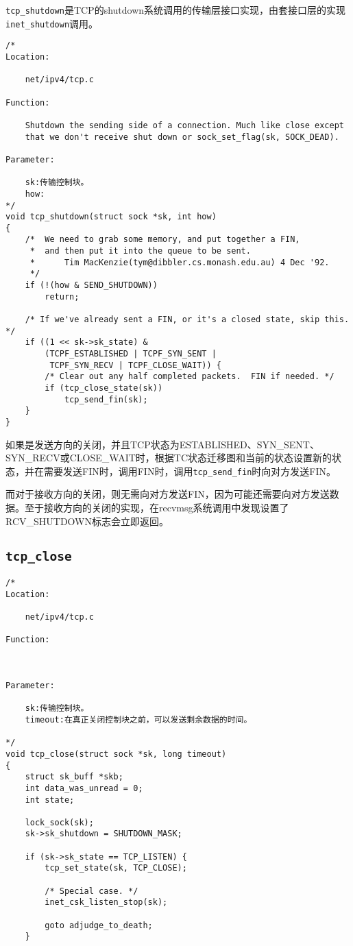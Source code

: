 		\texttt{tcp_shutdown}是TCP的shutdown系统调用的传输层接口实现，由套接口层的实现\texttt{inet_shutdown}调用。
\begin{verbatim}
/*
Location:

	net/ipv4/tcp.c

Function:
	
	Shutdown the sending side of a connection. Much like close except
	that we don't receive shut down or sock_set_flag(sk, SOCK_DEAD).

Parameter:

	sk:传输控制块。
	how:
*/
void tcp_shutdown(struct sock *sk, int how)
{
	/*	We need to grab some memory, and put together a FIN,
	 *	and then put it into the queue to be sent.
	 *		Tim MacKenzie(tym@dibbler.cs.monash.edu.au) 4 Dec '92.
	 */
	if (!(how & SEND_SHUTDOWN))
		return;

	/* If we've already sent a FIN, or it's a closed state, skip this. */
	if ((1 << sk->sk_state) &
	    (TCPF_ESTABLISHED | TCPF_SYN_SENT |
	     TCPF_SYN_RECV | TCPF_CLOSE_WAIT)) {
		/* Clear out any half completed packets.  FIN if needed. */
		if (tcp_close_state(sk))
			tcp_send_fin(sk);
	}
}
\end{verbatim}
		如果是发送方向的关闭，并且TCP状态为ESTABLISHED、SYN\_SENT、SYN\_RECV或CLOSE\_WAIT时，根据TC状态迁移图和当前的状态设置新的状态，并在需要发送FIN时，调用FIN时，调用\texttt{tcp_send_fin}时向对方发送FIN。

		而对于接收方向的关闭，则无需向对方发送FIN，因为可能还需要向对方发送数据。至于接收方向的关闭的实现，在recvmsg系统调用中发现设置了RCV\_SHUTDOWN标志会立即返回。

	\subsection{\texttt{tcp_close}}
\begin{verbatim}
/*
Location:

	net/ipv4/tcp.c

Function:

		

Parameter:

	sk:传输控制块。
	timeout:在真正关闭控制块之前，可以发送剩余数据的时间。
	
*/
void tcp_close(struct sock *sk, long timeout)
{
	struct sk_buff *skb;
	int data_was_unread = 0;
	int state;

	lock_sock(sk);
	sk->sk_shutdown = SHUTDOWN_MASK;

	if (sk->sk_state == TCP_LISTEN) {
		tcp_set_state(sk, TCP_CLOSE);

		/* Special case. */
		inet_csk_listen_stop(sk);

		goto adjudge_to_death;
	}
\end{verbatim}

